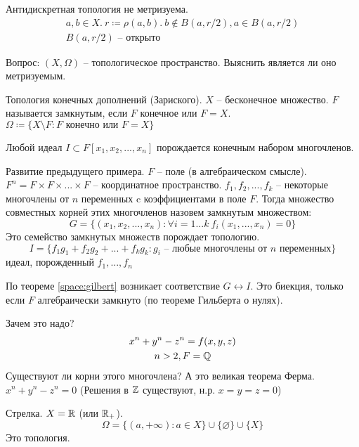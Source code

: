 \documentclass[main]{subfiles}
\begin{document}
Антидискретная топология не метризуема.
\begin{gather*}
    a, b \in X. \ r \coloneqq \rho(a,b). \ b \not\in B(a, r/2), a \in  B(a, r/2)\\
    B(a, r/2) \text{ -- открыто}
\end{gather*}

Вопрос: $(X, \Omega)$ -- топологическое пространство. Выяснить является ли
оно метризуемым.

\begin{example}
    Топология конечных дополнений (Зариского). $X$ -- бесконечное множество.
    $F$ называется замкнутым, если $F$ конечное или $F=X$.
    $\Omega \coloneqq \{X \setminus F: F \text{ конечно или $F=X$}\}$
\end{example}

\begin{theorem} \label{space:gilbert}
    Любой идеал $I \subset F[x_1, x_2, ..., x_n]$ порождается конечным набором многочленов.
\end{theorem}

\begin{example}
    Развитие предыдущего примера. $F$ -- поле (в алгебраическом смысле).
    $F^n = F \times F \times ... \times F$ -- координатное пространство.
    $f_1, f_2, ..., f_k$ -- некоторые многочлены от $n$ переменных c коэффициентами в поле $F$.
    Тогда множество совместных корней этих многочленов назовем замкнутым множеством:
    \[G = \{(x_1, x_2,..., x_n): \forall i = 1...k \  f_i (x_1,..., x_n) = 0\}\]
    Это семейство замкнутых множеств порождает топологию.
    \[I = \{f_1 g_1 + f_2 g_2 + ... + f_k g_k : g_i \text{ -- любые многочлены от $n$ переменных}\}\]
    идеал, порожденный $f_1,...,f_n$

    По теореме \ref{space:gilbert} возникает соответствие $G \leftrightarrow I$.
    Это биекция, только если $F$ алгебраически замкнуто (по теореме Гильберта о нулях).

    Зачем это надо?
    \begin{gather*}
        x^n + y^n - z^n = f(x,y,z)\\
        n > 2, F = \mathbb{Q}
    \end{gather*}
    Существуют ли корни этого многочлена?
    А это великая теорема Ферма.
    $x^n + y^n - z^n = 0$
    (Решения в $\mathbb{Z}$ существуют, н.р. $x=y=z=0$)
\end{example}

\begin{example}
    Стрелка. $X = \mathbb{R}$ (или $\mathbb{R}_+$).
    \[\Omega = \{(a, +\infty): a \in X\} \cup \{\varnothing\} \cup \{X\}\]
    Это топология.
\end{example}
\end{document}
